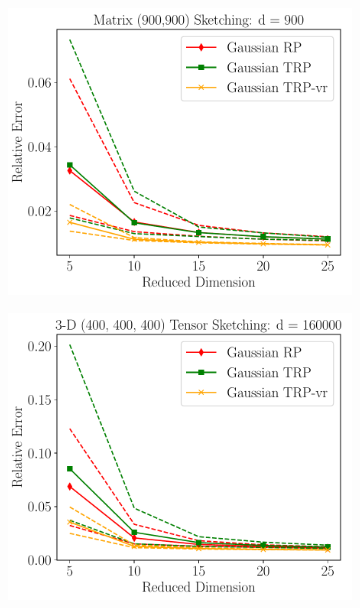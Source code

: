\begin{figure}[ht!]
	\centering
	\begin{subfigure}{0.32\textwidth}
		\includegraphics[scale = 0.3]{figure/col_dim2_krao_d900.pdf}
	\end{subfigure}
	\begin{subfigure}{0.32\textwidth}
		\includegraphics[scale = 0.3]{figure/col_dim3_krao_d160000.pdf}
	\end{subfigure}
	\begin{subfigure}{0.32\textwidth}

\end{subfigure}
\end{figure}
